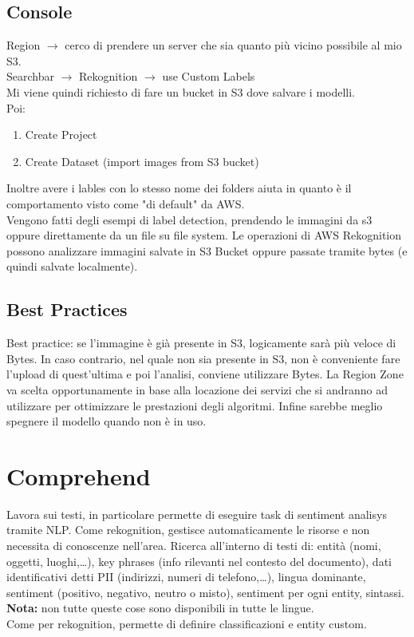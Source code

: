 \documentclass{classes/base}
\begin{document}
    \subsection*{Console}
    Region $\rightarrow$ cerco di prendere un server che sia quanto più vicino possibile al mio S3. \\
    Searchbar $\rightarrow$ Rekognition $\rightarrow$ use Custom Labels \\
    Mi viene quindi richiesto di fare un bucket in S3 dove salvare i modelli.\\
    Poi: 
    \begin{enumerate} 
        \item Create Project
        \item Create Dataset (import images from S3 bucket)
    \end{enumerate}
    Inoltre avere i lables con lo stesso nome dei folders aiuta in quanto è il comportamento visto come "di default" da AWS.\\
    Vengono fatti degli esempi di label detection, prendendo le immagini da s3 oppure direttamente da un file su file system.
    Le operazioni di AWS Rekognition possono analizzare immagini salvate in S3 Bucket oppure passate tramite bytes (e quindi salvate localmente).

    \subsection*{Best Practices}
    Best practice: se l'immagine è già presente in S3, logicamente sarà più veloce di Bytes.
    In caso contrario, nel quale non sia presente in S3, non è conveniente fare l'upload di quest'ultima e poi l'analisi, conviene utilizzare Bytes.
    La Region Zone va scelta opportunamente in base alla locazione dei servizi che si andranno ad utilizzare per ottimizzare le prestazioni degli algoritmi.
    Infine sarebbe meglio spegnere il modello quando non è in uso.

    \section*{Comprehend}
    Lavora sui testi, in particolare permette di eseguire task di sentiment analisys tramite NLP.
    Come rekognition, gestisce automaticamente le risorse e non necessita di conoscenze nell'area.
    Ricerca all'interno di testi di: entità (nomi, oggetti, luoghi,…), key phrases (info rilevanti nel contesto del documento), dati identificativi detti PII (indirizzi, numeri di telefono,…), lingua dominante, sentiment (positivo, negativo, neutro o misto), sentiment per ogni entity, sintassi. \\
    \textbf{Nota:} non tutte queste cose sono disponibili in tutte le lingue. \\
    Come per rekognition, permette di definire classificazioni e entity custom.
\end{document}

